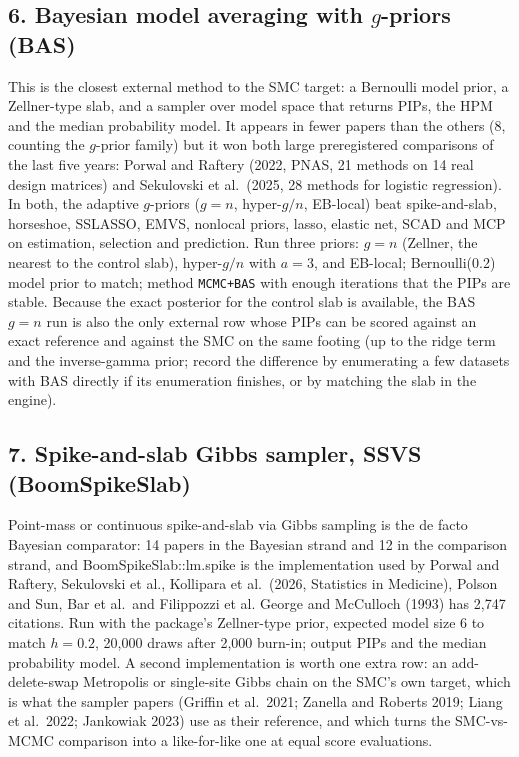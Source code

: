 \documentclass[11pt,letterpaper]{article}
\newcommand{\code}[1]{\texttt{#1}}
\newcommand{\pkg}[1]{\textsf{#1}}
\begin{document}
\subsection*{6. Bayesian model averaging with $g$-priors (\pkg{BAS})}
This is the closest external method to the SMC target: a Bernoulli model prior, a Zellner-type slab, and a sampler over model space that returns PIPs, the HPM and the median probability model. It appears in fewer papers than the others (8, counting the $g$-prior family) but it won both large preregistered comparisons of the last five years: Porwal and Raftery (2022, PNAS, 21 methods on 14 real design matrices) and Sekulovski et al.\ (2025, 28 methods for logistic regression). In both, the adaptive $g$-priors ($g=n$, hyper-$g/n$, EB-local) beat spike-and-slab, horseshoe, SSLASSO, EMVS, nonlocal priors, lasso, elastic net, SCAD and MCP on estimation, selection and prediction. Run three priors: $g=n$ (Zellner, the nearest to the control slab), hyper-$g/n$ with $a=3$, and EB-local; Bernoulli(0.2) model prior to match; method \code{MCMC+BAS} with enough iterations that the PIPs are stable. Because the exact posterior for the control slab is available, the BAS $g=n$ run is also the only external row whose PIPs can be scored against an exact reference and against the SMC on the same footing (up to the ridge term and the inverse-gamma prior; record the difference by enumerating a few datasets with \pkg{BAS} directly if its enumeration finishes, or by matching the slab in the engine).

\subsection*{7. Spike-and-slab Gibbs sampler, SSVS (\pkg{BoomSpikeSlab})}
Point-mass or continuous spike-and-slab via Gibbs sampling is the de facto Bayesian comparator: 14 papers in the Bayesian strand and 12 in the comparison strand, and \pkg{BoomSpikeSlab::lm.spike} is the implementation used by Porwal and Raftery, Sekulovski et al., Kollipara et al.\ (2026, Statistics in Medicine), Polson and Sun, Bar et al.\ and Filippozzi et al. George and McCulloch (1993) has 2{,}747 citations. Run with the package's Zellner-type prior, expected model size 6 to match $h=0.2$, 20{,}000 draws after 2{,}000 burn-in; output PIPs and the median probability model. A second implementation is worth one extra row: an add-delete-swap Metropolis or single-site Gibbs chain on the SMC's own target, which is what the sampler papers (Griffin et al.\ 2021; Zanella and Roberts 2019; Liang et al.\ 2022; Jankowiak 2023) use as their reference, and which turns the SMC-vs-MCMC comparison into a like-for-like one at equal score evaluations.
\end{document}
